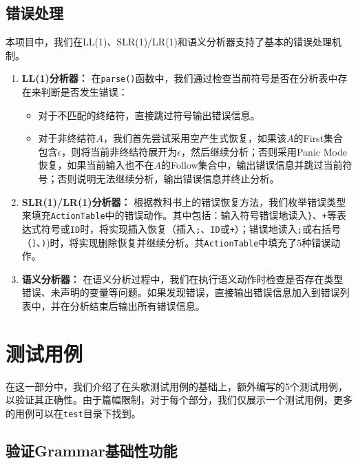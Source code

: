\documentclass[UTF8,openany]{ctexbook}
\begin{document}
\section{错误处理}

本项目中，我们在LL(1)、SLR(1)/LR(1)和语义分析器支持了基本的错误处理机制。

\begin{enumerate}[noitemsep,topsep=0pt,partopsep=0pt]
    \item \textbf{LL(1)分析器：} 在\texttt{parse()}函数中，我们通过检查当前符号是否在分析表中存在来判断是否发生错误：
    \begin{itemize}[noitemsep,topsep=0pt,partopsep=0pt]
        \item 对于不匹配的终结符，直接跳过符号输出错误信息。
        \item 对于非终结符$A$，我们首先尝试采用空产生式恢复，如果该$A$的First集合包含$\epsilon$，则将当前非终结符展开为$\epsilon$，然后继续分析；否则采用Panic Mode恢复，如果当前输入也不在$A$的Follow集合中，输出错误信息并跳过当前符号；否则说明无法继续分析，输出错误信息并终止分析。
    \end{itemize}
    \item \textbf{SLR(1)/LR(1)分析器：} 根据教科书上的错误恢复方法，我们枚举错误类型来填充\texttt{ActionTable}中的错误动作。其中包括：输入符号错误地读入\texttt{\}}、\texttt{+}等表达式符号或\texttt{ID}时，将实现插入恢复（插入\texttt{;}、\texttt{ID}或\texttt{+}）；错误地读入\texttt{;}或右括号（\texttt{]}、\texttt{)})时，将实现删除恢复并继续分析。共\texttt{ActionTable}中填充了5种错误动作。
    \item \textbf{语义分析器：} 在语义分析过程中，我们在执行语义动作时检查是否存在类型错误、未声明的变量等问题。如果发现错误，直接输出错误信息加入到错误列表中，并在分析结束后输出所有错误信息。
    
\end{enumerate}

\chapter{测试用例}
\label{sec:test}

在这一部分中，我们介绍了在头歌测试用例的基础上，额外编写的5个测试用例，以验证其正确性。由于篇幅限制，对于每个部分，我们仅展示一个测试用例，更多的用例可以在\texttt{test}目录下找到。

\section{验证Grammar基础性功能}
\label{sec:test_grammar}
\end{document}
